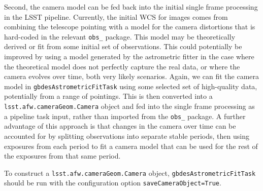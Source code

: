 \documentclass[DM,authoryear,toc]{lsstdoc}
\begin{document}
Second, the camera model can be fed back into the initial single frame processing in the LSST pipeline. Currently, the initial WCS for images comes from combining the telescope pointing with a model for the camera distortions that is hard-coded in the relevant \texttt{obs\_} package. This model may be theoretically derived or fit from some initial set of observations. This could potentially be improved by using a model generated by the astrometric fitter in the case where the theoretical model does not perfectly capture the real data, or where the camera evolves over time, both very likely scenarios. Again, we can fit the camera model in \texttt{gbdesAstrometricFitTask} using some selected set of high-quality data, potentially from a range of pointings. This is then converted into a \texttt{lsst.afw.cameraGeom.Camera} object and fed into the single frame processing as a pipeline task input, rather than imported from the \texttt{obs\_} package. A further advantage of this approach is that changes in the camera over time can be accounted for by splitting observations into separate stable periods, then using exposures from each period to fit a camera model that can be used for the rest of the exposures from that same period.

To construct a \texttt{lsst.afw.cameraGeom.Camera} object, \texttt{gbdesAstrometricFitTask} should be run with the configuration option \texttt{saveCameraObject=True}.
\end{document}
